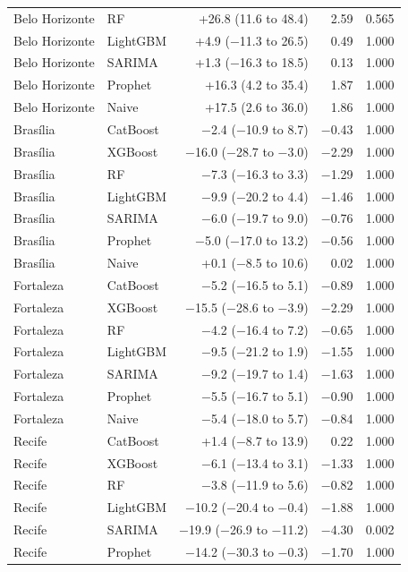 \documentclass[10pt,letterpaper]{article}
\begin{document}
\begin{longtable}{llrrr}
Belo Horizonte & RF & +26.8 (11.6 to 48.4) & 2.59 & 0.565 \\
Belo Horizonte & LightGBM & +4.9 ($-$11.3 to 26.5) & 0.49 & 1.000 \\
Belo Horizonte & SARIMA & +1.3 ($-$16.3 to 18.5) & 0.13 & 1.000 \\
Belo Horizonte & Prophet & +16.3 (4.2 to 35.4) & 1.87 & 1.000 \\
Belo Horizonte & Naive & +17.5 (2.6 to 36.0) & 1.86 & 1.000 \\
Bras\'ilia & CatBoost & $-$2.4 ($-$10.9 to 8.7) & $-$0.43 & 1.000 \\
Bras\'ilia & XGBoost & $-$16.0 ($-$28.7 to $-$3.0) & $-$2.29 & 1.000 \\
Bras\'ilia & RF & $-$7.3 ($-$16.3 to 3.3) & $-$1.29 & 1.000 \\
Bras\'ilia & LightGBM & $-$9.9 ($-$20.2 to 4.4) & $-$1.46 & 1.000 \\
Bras\'ilia & SARIMA & $-$6.0 ($-$19.7 to 9.0) & $-$0.76 & 1.000 \\
Bras\'ilia & Prophet & $-$5.0 ($-$17.0 to 13.2) & $-$0.56 & 1.000 \\
Bras\'ilia & Naive & +0.1 ($-$8.5 to 10.6) & 0.02 & 1.000 \\
Fortaleza & CatBoost & $-$5.2 ($-$16.5 to 5.1) & $-$0.89 & 1.000 \\
Fortaleza & XGBoost & $-$15.5 ($-$28.6 to $-$3.9) & $-$2.29 & 1.000 \\
Fortaleza & RF & $-$4.2 ($-$16.4 to 7.2) & $-$0.65 & 1.000 \\
Fortaleza & LightGBM & $-$9.5 ($-$21.2 to 1.9) & $-$1.55 & 1.000 \\
Fortaleza & SARIMA & $-$9.2 ($-$19.7 to 1.4) & $-$1.63 & 1.000 \\
Fortaleza & Prophet & $-$5.5 ($-$16.7 to 5.1) & $-$0.90 & 1.000 \\
Fortaleza & Naive & $-$5.4 ($-$18.0 to 5.7) & $-$0.84 & 1.000 \\
Recife & CatBoost & +1.4 ($-$8.7 to 13.9) & 0.22 & 1.000 \\
Recife & XGBoost & $-$6.1 ($-$13.4 to 3.1) & $-$1.33 & 1.000 \\
Recife & RF & $-$3.8 ($-$11.9 to 5.6) & $-$0.82 & 1.000 \\
Recife & LightGBM & $-$10.2 ($-$20.4 to $-$0.4) & $-$1.88 & 1.000 \\
Recife & SARIMA & $-$19.9 ($-$26.9 to $-$11.2) & $-$4.30 & 0.002 \\
Recife & Prophet & $-$14.2 ($-$30.3 to $-$0.3) & $-$1.70 & 1.000 \\

\end{longtable}
\end{document}
